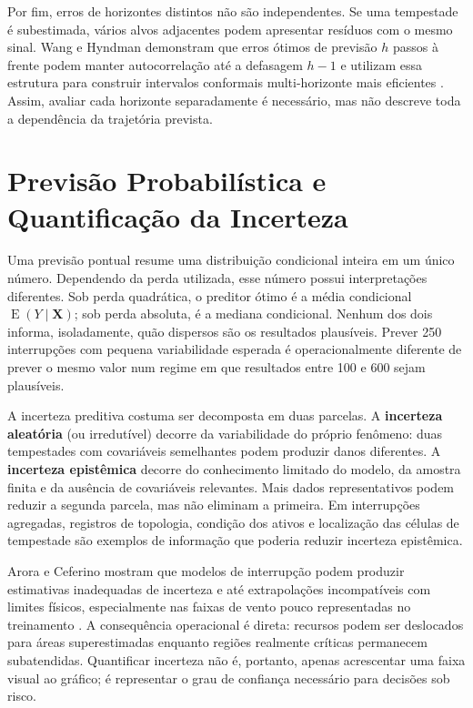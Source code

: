 Por fim, erros de horizontes distintos não são independentes. Se uma tempestade é subestimada, vários alvos adjacentes podem apresentar resíduos com o mesmo sinal. Wang e Hyndman demonstram que erros ótimos de previsão $h$ passos à frente podem manter autocorrelação até a defasagem $h-1$ e utilizam essa estrutura para construir intervalos conformais multi-horizonte mais eficientes \cite{wang2024conformal}. Assim, avaliar cada horizonte separadamente é necessário, mas não descreve toda a dependência da trajetória prevista.

\section{Previsão Probabilística e Quantificação da Incerteza}\label{sec:previsao_probabilistica}

Uma previsão pontual resume uma distribuição condicional inteira em um único número. Dependendo da perda utilizada, esse número possui interpretações diferentes. Sob perda quadrática, o preditor ótimo é a média condicional $\operatorname{E}(Y\mid\mathbf{X})$; sob perda absoluta, é a mediana condicional. Nenhum dos dois informa, isoladamente, quão dispersos são os resultados plausíveis. Prever 250 interrupções com pequena variabilidade esperada é operacionalmente diferente de prever o mesmo valor num regime em que resultados entre 100 e 600 sejam plausíveis.

A incerteza preditiva costuma ser decomposta em duas parcelas. A \textbf{incerteza aleatória} (ou irredutível) decorre da variabilidade do próprio fenômeno: duas tempestades com covariáveis semelhantes podem produzir danos diferentes. A \textbf{incerteza epistêmica} decorre do conhecimento limitado do modelo, da amostra finita e da ausência de covariáveis relevantes. Mais dados representativos podem reduzir a segunda parcela, mas não eliminam a primeira. Em interrupções agregadas, registros de topologia, condição dos ativos e localização das células de tempestade são exemplos de informação que poderia reduzir incerteza epistêmica.

Arora e Ceferino mostram que modelos de interrupção podem produzir estimativas inadequadas de incerteza e até extrapolações incompatíveis com limites físicos, especialmente nas faixas de vento pouco representadas no treinamento \cite{arora2023probabilistic}. A consequência operacional é direta: recursos podem ser deslocados para áreas superestimadas enquanto regiões realmente críticas permanecem subatendidas. Quantificar incerteza não é, portanto, apenas acrescentar uma faixa visual ao gráfico; é representar o grau de confiança necessário para decisões sob risco.

